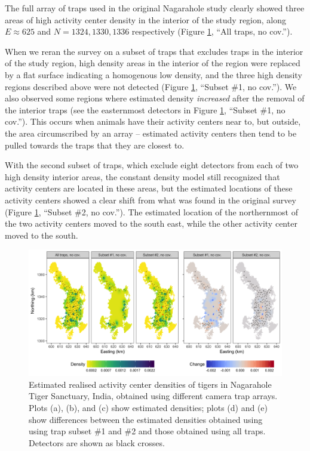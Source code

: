 \documentclass[a4paper,12pt]{article}
\begin{document}
The full array of traps used in the original Nagarahole study clearly showed three areas of high activity center density in the interior of the study region, along $E\approx 625$ and $N=1324, 1330, 1336$ respectively (Figure \ref{tigernocov}, ``All traps, no cov.''). 

When we reran the survey on a subset of traps that excludes traps in the interior of the study region, high density areas in the interior of the region were replaced by a flat surface indicating a homogenous low density, and the three high density regions described above were not detected  (Figure \ref{tigernocov}, ``Subset \#1, no cov.''). We also observed some regions where estimated density {\it increased} after the removal of the interior traps (see the easternmost detectors in Figure \ref{tigernocov}, ``Subset \#1, no cov.''). This occurs when animals have their activity centers near to, but outside, the area circumscribed by an array -- estimated activity centers then tend to be pulled towards the traps that they are closest to. 

With the second subset of traps, which exclude eight detectors from each of two high density interior areas, the constant density model still recognized that activity centers are located in these areas, but the estimated locations of these activity centers showed a clear shift from what was found in the original survey (Figure \ref{tigernocov}, ``Subset \#2, no cov.''). The estimated location of the northernmost of the two activity centers moved to the south east, while the other activity center moved to the south.

\begin{figure}[htbp]
\centering
\includegraphics[width=1\textwidth]{tiger_surfaces_nocovs.png}
\caption{Estimated realised activity center densities of tigers in Nagarahole Tiger Sanctuary, India, obtained using different camera trap arrays. Plots (a), (b), and (c) show estimated densities; plots (d) and (e) show differences between the estimated densities obtained using using trap subset \#1 and \#2 and those obtained using all traps. Detectors are shown as black crosses.}
\label{tigernocov}
\end{figure}
\end{document}
